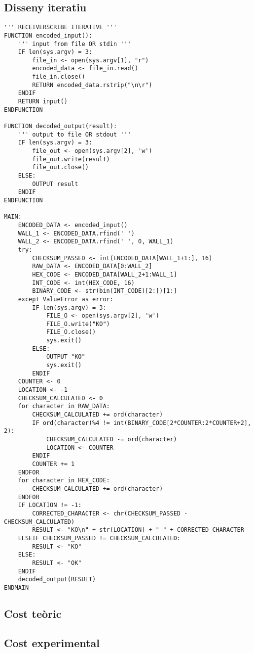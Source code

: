 \documentclass{article}
\begin{document}
\subsection{Disseny iteratiu}
\begin{lstlisting}
''' RECEIVERSCRIBE ITERATIVE '''
FUNCTION encoded_input():
    ''' input from file OR stdin '''
    IF len(sys.argv) = 3:
        file_in <- open(sys.argv[1], "r")
        encoded_data <- file_in.read()
        file_in.close()
        RETURN encoded_data.rstrip("\n\r")
    ENDIF
    RETURN input()
ENDFUNCTION

FUNCTION decoded_output(result):
    ''' output to file OR stdout '''
    IF len(sys.argv) = 3:
        file_out <- open(sys.argv[2], 'w')
        file_out.write(result)
        file_out.close()
    ELSE:
        OUTPUT result
    ENDIF
ENDFUNCTION

MAIN:
    ENCODED_DATA <- encoded_input()
    WALL_1 <- ENCODED_DATA.rfind(' ')
    WALL_2 <- ENCODED_DATA.rfind(' ', 0, WALL_1)
    try:
        CHECKSUM_PASSED <- int(ENCODED_DATA[WALL_1+1:], 16)
        RAW_DATA <- ENCODED_DATA[0:WALL_2]
        HEX_CODE <- ENCODED_DATA[WALL_2+1:WALL_1]
        INT_CODE <- int(HEX_CODE, 16)
        BINARY_CODE <- str(bin(INT_CODE)[2:])[1:]
    except ValueError as error:
        IF len(sys.argv) = 3:
            FILE_O <- open(sys.argv[2], 'w')
            FILE_O.write("KO")
            FILE_O.close()
            sys.exit()
        ELSE:
            OUTPUT "KO"
            sys.exit()
        ENDIF
    COUNTER <- 0
    LOCATION <- -1
    CHECKSUM_CALCULATED <- 0
    for character in RAW_DATA:
        CHECKSUM_CALCULATED += ord(character)
        IF ord(character)%4 != int(BINARY_CODE[2*COUNTER:2*COUNTER+2], 2):
            CHECKSUM_CALCULATED -= ord(character)
            LOCATION <- COUNTER
        ENDIF
        COUNTER += 1
    ENDFOR
    for character in HEX_CODE:
        CHECKSUM_CALCULATED += ord(character)
    ENDFOR
    IF LOCATION != -1:
        CORRECTED_CHARACTER <- chr(CHECKSUM_PASSED - CHECKSUM_CALCULATED)
        RESULT <- "KO\n" + str(LOCATION) + " " + CORRECTED_CHARACTER
    ELSEIF CHECKSUM_PASSED != CHECKSUM_CALCULATED:
        RESULT <- "KO"
    ELSE:
        RESULT <- "OK"
    ENDIF
    decoded_output(RESULT)
ENDMAIN
\end{lstlisting}
\subsection{Cost teòric}
\subsection{Cost experimental}
\end{document}
